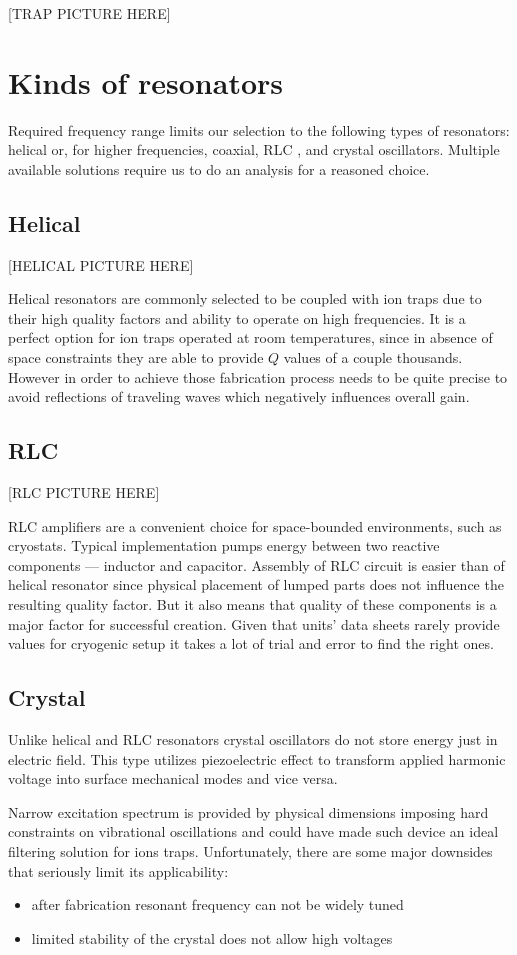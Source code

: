 [TRAP PICTURE HERE]

\section{Kinds of resonators}
\label{sec:kinds_resonators}
Required frequency range limits our selection to the following types of resonators: helical \cite{Gulde2017} or, for higher frequencies, coaxial, RLC \cite{Gandolfi2010}, and crystal oscillators. Multiple available solutions require us to do an analysis for a reasoned choice.
\subsection{Helical}
[HELICAL PICTURE HERE]

Helical resonators are commonly selected to be coupled with ion traps due to their high quality factors and ability to operate on high frequencies. It is a perfect option for ion traps operated at room temperatures, since in absence of space constraints they are able to provide $Q$ values of a couple thousands. However in order to achieve those fabrication process needs to be quite precise to avoid reflections of traveling waves which negatively influences overall gain.
\subsection{RLC}
[RLC PICTURE HERE]

RLC amplifiers are a convenient choice for space-bounded environments, such as cryostats. Typical implementation pumps energy between two reactive components --- inductor and capacitor. Assembly of RLC circuit is easier than of helical resonator since physical placement of lumped parts does not influence the resulting quality factor. But it also means that quality of these components is a major factor for successful creation. Given that units' data sheets rarely provide values for cryogenic setup it takes a lot of trial and error to find the right ones.
\subsection{Crystal}
Unlike helical and RLC resonators crystal oscillators do not store energy just in electric field. This type utilizes piezoelectric effect to transform applied harmonic voltage into surface mechanical modes and vice versa.

Narrow excitation spectrum is provided by physical dimensions imposing hard constraints on vibrational oscillations and could have made such device an ideal filtering solution for ions traps. Unfortunately, there are some major downsides that seriously limit its applicability:
\begin{itemize}
	\item after fabrication resonant frequency can not be widely tuned
	\item limited stability of the crystal does not allow high voltages
\end{itemize}
